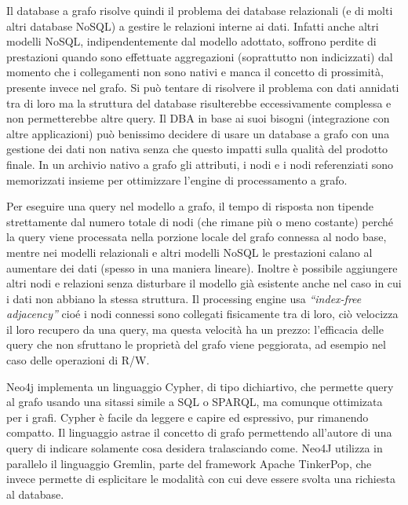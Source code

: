 \documentclass[a4page, 11pt]{article}
\begin{document}
Il database a grafo risolve quindi il problema dei database relazionali (e di molti altri database NoSQL) a gestire le relazioni interne ai dati.
Infatti anche altri modelli NoSQL, indipendentemente dal modello adottato, soffrono perdite di prestazioni quando sono effettuate aggregazioni (soprattutto non indicizzati) dal momento che i collegamenti non sono nativi e manca il concetto di prossimità, presente invece nel grafo.
Si può tentare di risolvere il problema con dati annidati tra di loro ma la struttura del database risulterebbe eccessivamente complessa e non permetterebbe altre query.
Il DBA in base ai suoi bisogni (integrazione con altre applicazioni) può benissimo decidere di usare un database a grafo con una gestione dei dati non nativa senza che questo impatti sulla qualità del prodotto finale.
In un archivio nativo a grafo gli attributi, i nodi e i nodi referenziati sono memorizzati insieme per ottimizzare l'engine di processamento a grafo.

Per eseguire una query nel modello a grafo, il tempo di risposta non tipende strettamente dal numero totale di nodi (che rimane più o meno costante) perché la query viene processata nella porzione locale del grafo connessa al nodo base, mentre nei modelli relazionali e altri modelli NoSQL le prestazioni calano al aumentare dei dati (spesso in una maniera lineare).
Inoltre è possibile aggiungere altri nodi e relazioni senza disturbare il modello già esistente anche nel caso in cui i dati non abbiano la stessa struttura.
Il processing engine usa \textit{``index-free adjacency''} cioé i nodi connessi sono collegati fisicamente tra di loro, ciò velocizza il loro recupero da una query, ma questa velocità ha un prezzo: l'efficacia delle query che non sfruttano le proprietà del grafo viene peggiorata, ad esempio nel caso delle operazioni di R/W.   

Neo4j implementa un linguaggio Cypher, di tipo dichiartivo, che permette query al grafo usando una sitassi simile a SQL o SPARQL, ma comunque ottimizata per i grafi.
Cypher è facile da leggere e capire ed espressivo, pur rimanendo compatto.
Il linguaggio astrae il concetto di grafo permettendo all'autore di una query di indicare solamente cosa desidera tralasciando come. \newline
Neo4J utilizza in parallelo il linguaggio Gremlin, parte del framework Apache TinkerPop, che invece permette di esplicitare le modalità con cui deve essere svolta una richiesta al database.

\newpage
\printbibliography[title={Letture di approfondimento}]
\end{document}
